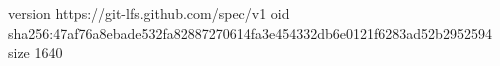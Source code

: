 version https://git-lfs.github.com/spec/v1
oid sha256:47af76a8ebade532fa82887270614fa3e454332db6e0121f6283ad52b2952594
size 1640
